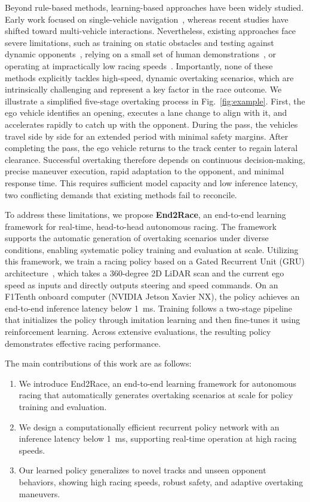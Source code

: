 \documentclass[letterpaper,10 pt,conference]{ieeeconf}
\begin{document}
Beyond rule-based methods, learning-based approaches have been widely studied. Early work focused on single-vehicle navigation~\cite{10186780,9811650}, whereas recent studies have shifted toward multi-vehicle interactions. Nevertheless, existing approaches face severe limitations, such as training on static obstacles and testing against dynamic opponents~\cite{zarrar2024tinylidarnet}, relying on a small set of human demonstrations~\cite{10275226}, or operating at impractically low racing speeds~\cite{steiner2025overtaking}. Importantly, none of these methods explicitly tackles high-speed, dynamic overtaking scenarios, which are intrinsically challenging and represent a key factor in the race outcome.
We illustrate a simplified five-stage overtaking process in Fig.~\ref{fig:example}.
First, the ego vehicle identifies an opening, executes a lane change to align with it, and accelerates rapidly to catch up with the opponent.
During the pass, the vehicles travel side by side for an extended period with minimal safety margins.
After completing the pass, the ego vehicle returns to the track center to regain lateral clearance.
Successful overtaking therefore depends on continuous decision-making, precise maneuver execution, rapid adaptation to the opponent, and minimal response time.
This requires sufficient model capacity and low inference latency, two conflicting demands that existing methods fail to reconcile.

To address these limitations, we propose \textbf{End2Race}, an end-to-end learning framework for real-time, head-to-head autonomous racing.
The framework supports the automatic generation of overtaking scenarios under diverse conditions, enabling systematic policy training and evaluation at scale.
Utilizing this framework, we train a racing policy based on a Gated Recurrent Unit (GRU) architecture~\cite{cho2014learning}, which takes a 360-degree 2D LiDAR scan and the current ego speed as inputs and directly outputs steering and speed commands.
On an F1Tenth onboard computer (NVIDIA Jetson Xavier NX), the policy achieves an end-to-end inference latency below 1~ms.
Training follows a two-stage pipeline that initializes the policy through imitation learning and then fine-tunes it using reinforcement learning.
Across extensive evaluations, the resulting policy demonstrates effective racing performance.

The main contributions of this work are as follows:

\begin{enumerate}
\item We introduce End2Race, an end-to-end learning framework for autonomous racing that automatically generates overtaking scenarios at scale for policy training and evaluation.

\item We design a computationally efficient recurrent policy network with an inference latency below 1~ms, supporting real-time operation at high racing speeds.

\item Our learned policy generalizes to novel tracks and unseen opponent behaviors, showing high racing speeds, robust safety, and adaptive overtaking maneuvers.
\end{enumerate}
\end{document}
